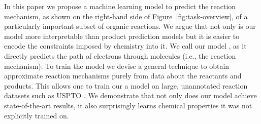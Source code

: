 In this paper we propose a machine learning model to predict the reaction mechanism, as shown on the right-hand side of Figure~\ref{fig:task-overview}, of a particularly important subset of organic reactions.
We argue that not only is our model more interpretable than product prediction models but it is easier to encode the constraints imposed by chemistry into it. 
We call our model \ourModel, as it directly predicts the path of electrons through molecules (i.e., the reaction mechanism). To train the model we devise a general technique to obtain approximate reaction mechanisms purely from data about the reactants and products. This allows one to train our a model on large, unannotated reaction datasets such as USPTO \cite{lowe2012extraction}. We demonstrate that not only does our model achieve state-of-the-art results, it also surprisingly learns chemical properties it was not explicitly trained on.



